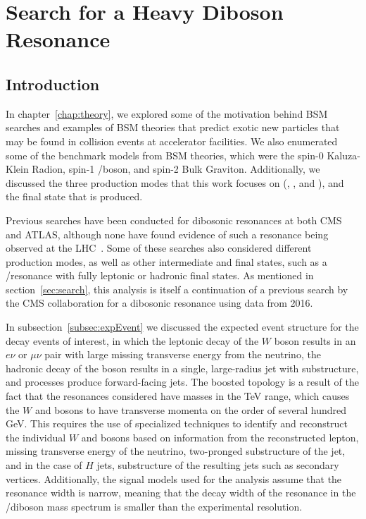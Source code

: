 
\chapter{Search for a Heavy Diboson Resonance}
\label{chap:analysis}

\section{Introduction}

In chapter~\ref{chap:theory}, we explored some of the motivation behind BSM searches and examples of BSM theories that predict exotic new particles that may be found in collision events at accelerator facilities.
We also enumerated some of the benchmark models from BSM theories, which were the spin-0 Kaluza-Klein Radion, spin-1 \Wpr/\Zpr boson, and spin-2 Bulk Graviton.
Additionally, we discussed the three production modes that this work focuses on (\VBF, \ggF, and \DY), and the final state that is produced.

Previous searches have been conducted for dibosonic resonances at both CMS and ATLAS, although none have found evidence of such a resonance being observed at the LHC~\cite{Sirunyan_18,Aaboud_18,Aaboud_18_2,Aad_15,Khachatryan_14,Sirunyan_17,Sirunyan_17_2,atlas20}.
Some of these searches also considered different production modes, as well as other intermediate and final states, such as a \ZZ/\ZH resonance with fully leptonic or hadronic final states.
As mentioned in section~\ref{sec:search}, this analysis is itself a continuation of a previous search by the CMS collaboration for a dibosonic resonance using data from 2016.

In subsection~\ref{subsec:expEvent} we discussed the expected event structure for the decay events of interest, in which the leptonic decay of the $W$ boson results in an $e\nu$ or $\mu\nu$ pair with large missing transverse energy from the neutrino, the hadronic decay of the \VorH boson results in a single, large-radius jet with substructure, and \VBF processes produce forward-facing jets.
The boosted topology is a result of the fact that the resonances considered have masses in the TeV range, which causes the $W$ and \VorH bosons to have transverse momenta on the order of several hundred GeV.
This requires the use of specialized techniques to identify and reconstruct the individual $W$ and \VorH bosons based on information from the reconstructed lepton, missing transverse energy of the neutrino, two-pronged substructure of the jet, and in the case of $H$ jets, substructure of the resulting \bbbar jets such as secondary vertices.
Additionally, the signal models used for the analysis assume that the resonance width is narrow, meaning that the decay width of the resonance in the \WV/\WH diboson mass spectrum is smaller than the experimental resolution.

